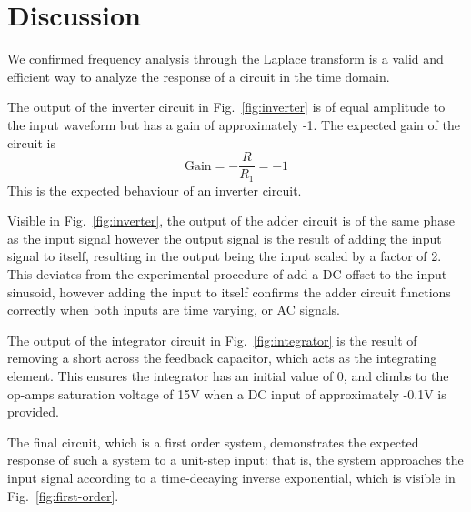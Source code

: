 \section{Discussion}\label{sec:discussion}
We confirmed frequency analysis through the Laplace transform is a valid and efficient way to analyze the response of a circuit in the time domain.

The output of the inverter circuit in Fig.~\ref{fig:inverter} is of equal amplitude to the input waveform but has a gain of approximately -1. The expected gain of the circuit is 
\begin{equation*}
	\text{Gain} = -\frac{R}{R_1} = -1
\end{equation*}
This is the expected behaviour of an inverter circuit.

Visible in Fig.~\ref{fig:inverter}, the output of the adder circuit is of the same phase as the input signal however the output signal is the result of adding the input signal to itself, resulting in the output being the input scaled by a factor of 2. This deviates from the experimental procedure of add a DC offset to the input sinusoid, however adding the input to itself confirms the adder circuit functions correctly when both inputs are time varying, or AC signals.

The output of the integrator circuit in Fig.~\ref{fig:integrator} is the result of removing a short across the feedback capacitor, which acts as the integrating element. This ensures the integrator has an initial value of 0, and climbs to the op-amps saturation voltage of 15\si{\volt} when a DC input of approximately -0.1\si{\volt} is provided.

The final circuit, which is a first order system, demonstrates the expected response of such a system to a unit-step input: that is, the system approaches the input signal according to a time-decaying inverse exponential, which is visible in Fig.~\ref{fig:first-order}.
